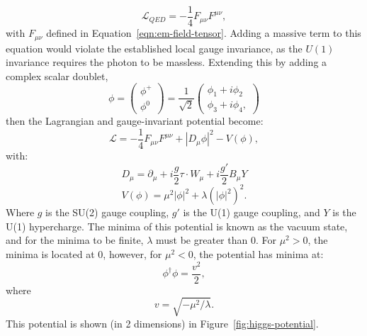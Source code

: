 \begin{equation}
    \mathcal{L}_{QED} = - \frac{1}{4} F_{\mu \nu}F^{\mu \nu},
\end{equation}
with $F_{\mu \nu}$ defined in Equation~\ref{eqn:em-field-tensor}. Adding a massive term to this equation would violate the established local gauge invariance, as the $U(1)$ invariance requires the photon to be massless. Extending this by adding a complex scalar doublet,
\begin{equation}
\phi = \begin{pmatrix} \phi^+ \\ \phi^0 \end{pmatrix}
    = \frac{1}{\sqrt{2}}\begin{pmatrix}
        \phi_1 + i\phi_2 \\ \phi_3 + i\phi_4,
    \end{pmatrix}
\end{equation}
%
then the Lagrangian and gauge-invariant potential become:
\begin{equation}
    \mathcal{L} = - \frac{1}{4} F_{\mu \nu}F^{\mu \nu} + |D_{\mu}\phi|^2 - V(\phi),
\end{equation}
with:
\begin{equation}
    D_{\mu} = \partial_{\mu} + i \frac{g}{2}\tau \cdot W_{\mu} + i \frac{g'}{2}B_{\mu}Y
\end{equation}
\begin{equation}
    V(\phi) = \mu^2 |\phi|^2 + \lambda (|\phi|^2)^2.
\end{equation}
Where $g$ is the SU(2) gauge coupling, $g'$ is the U(1) gauge coupling, and $Y$ is the U(1) hypercharge. The minima of this potential is known as the vacuum state, and for the minima to be finite, $\lambda$ must be greater than 0. For $\mu^2 >0$, the minima is located at 0, however, for $\mu^2<0$, the potential has minima at:
\begin{equation}
    \phi^\dagger \phi = \frac{v^2}{2},
\end{equation}
where 
\begin{equation}
    v = \sqrt{-\mu^2 / \lambda}.
\end{equation}
This potential is shown (in 2 dimensions) in Figure~\ref{fig:higgs-potential}. 

